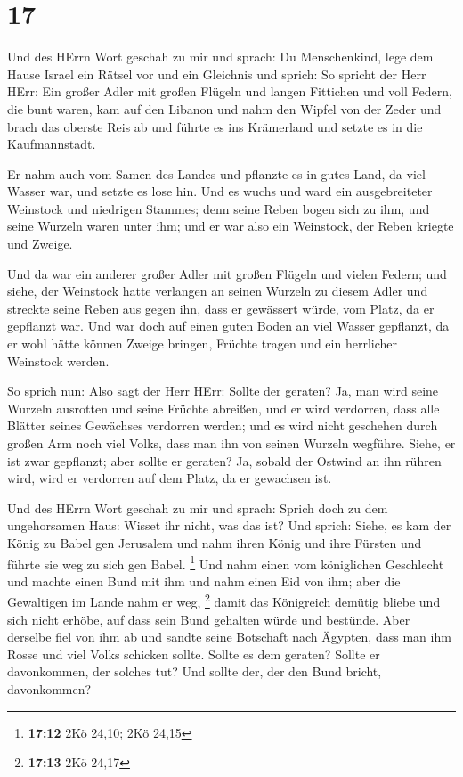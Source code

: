 \hypertarget{section-4}{%
\section{17}\label{section-4}}

 Und des HErrn Wort geschah zu mir und sprach: 
Du Menschenkind, lege dem Hause Israel ein Rätsel vor und ein Gleichnis
 und sprich: So spricht der Herr HErr: Ein großer Adler mit
großen Flügeln und langen Fittichen und voll Federn, die bunt waren, kam
auf den Libanon und nahm den Wipfel von der Zeder  und brach
das oberste Reis ab und führte es ins Krämerland und setzte es in die
Kaufmannstadt.

 Er nahm auch vom Samen des Landes und pflanzte es in gutes
Land, da viel Wasser war, und setzte es lose hin.  Und es
wuchs und ward ein ausgebreiteter Weinstock und niedrigen Stammes; denn
seine Reben bogen sich zu ihm, und seine Wurzeln waren unter ihm; und er
war also ein Weinstock, der Reben kriegte und Zweige.

 Und da war ein anderer großer Adler mit großen Flügeln und
vielen Federn; und siehe, der Weinstock hatte verlangen an seinen
Wurzeln zu diesem Adler und streckte seine Reben aus gegen ihn, dass er
gewässert würde, vom Platz, da er gepflanzt war.  Und war
doch auf einen guten Boden an viel Wasser gepflanzt, da er wohl hätte
können Zweige bringen, Früchte tragen und ein herrlicher Weinstock
werden.

 So sprich nun: Also sagt der Herr HErr: Sollte der geraten?
Ja, man wird seine Wurzeln ausrotten und seine Früchte abreißen, und er
wird verdorren, dass alle Blätter seines Gewächses verdorren werden; und
es wird nicht geschehen durch großen Arm noch viel Volks, dass man ihn
von seinen Wurzeln wegführe.  Siehe, er ist zwar gepflanzt;
aber sollte er geraten? Ja, sobald der Ostwind an ihn rühren wird, wird
er verdorren auf dem Platz, da er gewachsen ist.

 Und des HErrn Wort geschah zu mir und sprach:
 Sprich doch zu dem ungehorsamen Haus: Wisset ihr nicht,
was das ist? Und sprich: Siehe, es kam der König zu Babel gen Jerusalem
und nahm ihren König und ihre Fürsten und führte sie weg zu sich gen
Babel. \footnote{\textbf{17:12} 2Kö 24,10; 2Kö 24,15}  Und
nahm einen vom königlichen Geschlecht und machte einen Bund mit ihm und
nahm einen Eid von ihm; aber die Gewaltigen im Lande nahm er weg,
\footnote{\textbf{17:13} 2Kö 24,17}  damit das Königreich
demütig bliebe und sich nicht erhöbe, auf dass sein Bund gehalten würde
und bestünde.  Aber derselbe fiel von ihm ab und sandte
seine Botschaft nach Ägypten, dass man ihm Rosse und viel Volks schicken
sollte. Sollte es dem geraten? Sollte er davonkommen, der solches tut?
Und sollte der, der den Bund bricht, davonkommen?

